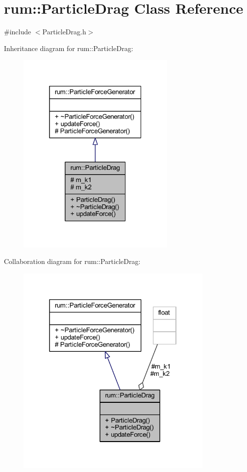 \hypertarget{classrum_1_1_particle_drag}{}\section{rum\+:\+:Particle\+Drag Class Reference}
\label{classrum_1_1_particle_drag}


{\ttfamily \#include $<$Particle\+Drag.\+h$>$}



Inheritance diagram for rum\+:\+:Particle\+Drag\+:\nopagebreak
\begin{figure}[H]
\begin{center}
\leavevmode
\includegraphics[width=220pt]{classrum_1_1_particle_drag__inherit__graph}
\end{center}
\end{figure}


Collaboration diagram for rum\+:\+:Particle\+Drag\+:\nopagebreak
\begin{figure}[H]
\begin{center}
\leavevmode
\includegraphics[width=274pt]{classrum_1_1_particle_drag__coll__graph}
\end{center}
\end{figure}

